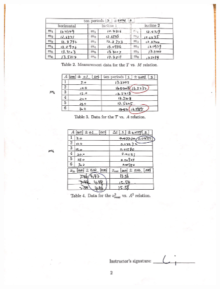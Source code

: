 \documentclass[11pt,a4paper]{article}
\begin{document}
\begin{figure}[H]
    \centering
    \includegraphics[scale=0.3]{data2.jpeg}

\end{figure}
\end{document}
